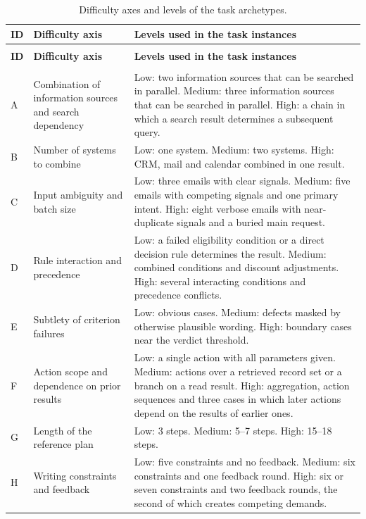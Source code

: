 \begingroup
\renewcommand{\baselinestretch}{1}
\small
\setlength{\tabcolsep}{4pt}
\renewcommand{\arraystretch}{1.08}
\begin{longtable}{>{\raggedright\arraybackslash}p{} >{\raggedright\arraybackslash}p{} >{\raggedright\arraybackslash}p{}}
\caption[Difficulty axes and levels of the task archetypes]{Difficulty axes and levels of the task archetypes.}\label{tab:app-difficulty} \\
\toprule
\textbf{ID} & \textbf{Difficulty axis} & \textbf{Levels used in the task instances} \\
\midrule
\endfirsthead
\multicolumn{3}{l}{\tablename~\thetable{} (continued)} \\
\toprule
\textbf{ID} & \textbf{Difficulty axis} & \textbf{Levels used in the task instances} \\
\midrule
\endhead
\midrule
\multicolumn{3}{r}{\emph{Continued on the next page.}} \\
\endfoot
\bottomrule
\endlastfoot
A & Combination of information sources and search dependency & Low: two information sources that can be searched in parallel. Medium: three information sources that can be searched in parallel. High: a chain in which a search result determines a subsequent query. \\
\addlinespace[2.5pt]
B & Number of systems to combine & Low: one system. Medium: two systems. High: CRM, mail and calendar combined in one result. \\
\addlinespace[2.5pt]
C & Input ambiguity and batch size & Low: three emails with clear signals. Medium: five emails with competing signals and one primary intent. High: eight verbose emails with near-duplicate signals and a buried main request. \\
\addlinespace[2.5pt]
D & Rule interaction and precedence & Low: a failed eligibility condition or a direct decision rule determines the result. Medium: combined conditions and discount adjustments. High: several interacting conditions and precedence conflicts. \\
\addlinespace[2.5pt]
E & Subtlety of criterion failures & Low: obvious cases. Medium: defects masked by otherwise plausible wording. High: boundary cases near the verdict threshold. \\
\addlinespace[2.5pt]
F & Action scope and dependence on prior results & Low: a single action with all parameters given. Medium: actions over a retrieved record set or a branch on a read result. High: aggregation, action sequences and three cases in which later actions depend on the results of earlier ones. \\
\addlinespace[2.5pt]
G & Length of the reference plan & Low: 3 steps. Medium: 5--7 steps. High: 15--18 steps. \\
\addlinespace[2.5pt]
H & Writing constraints and feedback & Low: five constraints and no feedback. Medium: six constraints and one feedback round. High: six or seven constraints and two feedback rounds, the second of which creates competing demands. \\
\end{longtable}
\endgroup



